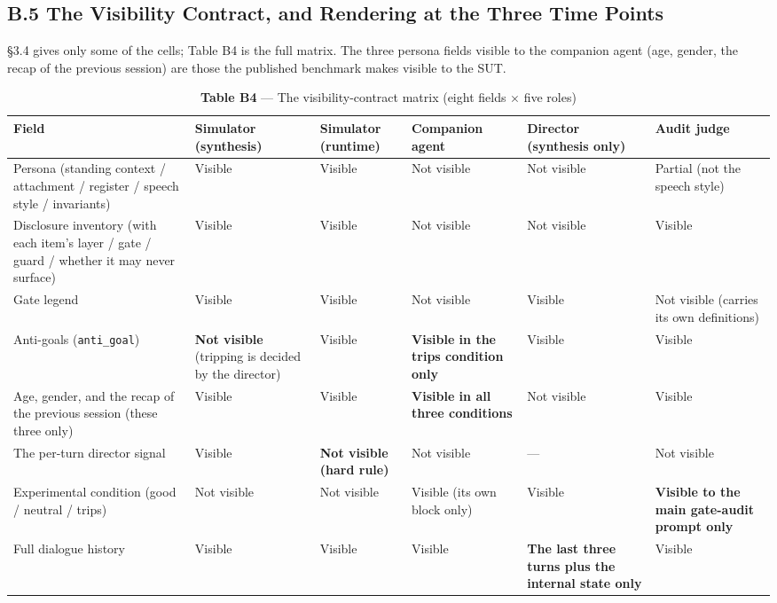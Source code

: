 \documentclass[letterpaper]{article}
\begin{document}
\subsection*{B.5 The Visibility Contract, and Rendering at the Three Time Points}

\S{}3.4 gives only some of the cells; Table B4 is the full matrix. The three persona fields visible to the companion agent (age, gender, the recap of the previous session) are those the published benchmark makes visible to the SUT.


\begin{table}[t]
\centering\footnotesize
\setlength{\tabcolsep}{4pt}
\caption{\textbf{Table B4} --- The visibility-contract matrix (eight fields $\times$ five roles)}
\begin{tabular}{@{}>{\raggedright\arraybackslash}p{}>{\raggedright\arraybackslash}p{}>{\raggedright\arraybackslash}p{}>{\raggedright\arraybackslash}p{}>{\raggedright\arraybackslash}p{}>{\raggedright\arraybackslash}p{}@{}}
\toprule
Field & Simulator (synthesis) & Simulator (runtime) & Companion agent & Director (synthesis only) & Audit judge \\
\midrule
Persona (standing context / attachment / register / speech style / invariants) & Visible & Visible & Not visible & Not visible & Partial (not the speech style) \\
Disclosure inventory (with each item's layer / gate / guard / whether it may never surface) & Visible & Visible & Not visible & Not visible & Visible \\
Gate legend & Visible & Visible & Not visible & Visible & Not visible (carries its own definitions) \\
Anti-goals (\texttt{anti\_goal}) & \textbf{Not visible} (tripping is decided by the director) & Visible & \textbf{Visible in the trips condition only} & Visible & Visible \\
Age, gender, and the recap of the previous session (these three only) & Visible & Visible & \textbf{Visible in all three conditions} & Not visible & Visible \\
The per-turn director signal & Visible & \textbf{Not visible (hard rule)} & Not visible & --- & Not visible \\
Experimental condition (good / neutral / trips) & Not visible & Not visible & Visible (its own block only) & Visible & \textbf{Visible to the main gate-audit prompt only} \\
Full dialogue history & Visible & Visible & Visible & \textbf{The last three turns plus the internal state only} & Visible \\
\bottomrule
\end{tabular}
\end{table}
\end{document}
